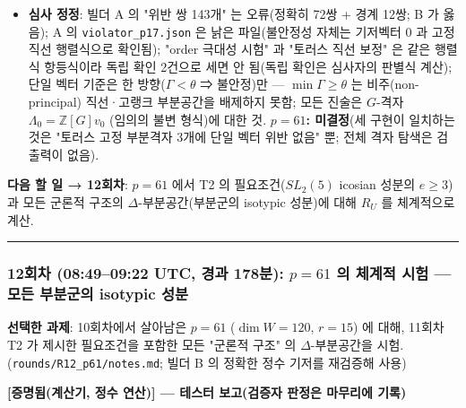 \begin{itemize}
\item
  \textbf{심사 정정}: 빌더 A 의 "위반 쌍 143개" 는 오류(정확히 72쌍 + 경계 12쌍; B 가 옳음); A 의 \texttt{violator\_p17.json} 은 낡은 파일(불안정성 자체는 기저벡터 0 과 고정직선 행렬식으로 확인됨); "order 극대성 시험" 과 "토러스 직선 보정" 은 같은 행렬식 항등식이라 독립 확인 2건으로 세면 안 됨(독립 확인은 심사자의 판별식 계산); 단일 벡터 기준은 한 방향(\(\Gamma<\theta\) ⇒ 불안정)만 --- \(\min\Gamma\ge\theta\) 는 비주(non-principal) 직선·고랭크 부분공간을 배제하지 못함; 모든 진술은 \(G\)-격자 \(\Lambda_0=\mathbb Z[G]v_0\) (임의의 불변 형식)에 대한 것. \textbf{\(p=61\): 미결정}(세 구현이 일치하는 것은 "토러스 고정 부분격자 3개에 단일 벡터 위반 없음" 뿐; 전체 격자 탐색은 검출력이 없음).
\end{itemize}

\textbf{다음 할 일 → 12회차}: \(p=61\) 에서 T2 의 필요조건(\(SL_2(5)\) icosian 성분의 \(e\ge3\))과 모든 군론적 구조의 \(\Delta\)-부분공간(부분군의 isotypic 성분)에 대해 \(R_U\) 를 체계적으로 계산.

\begin{center}\rule{0.5\linewidth}{0.5pt}\end{center}

\hypertarget{uxd68cuxcc28-08490922-utc-uxacbduxacfc-178uxbd84-p61-uxc758-uxccb4uxacc4uxc801-uxc2dcuxd5d8-uxbaa8uxb4e0-uxbd80uxbd84uxad70uxc758-isotypic-uxc131uxbd84}{%
\subsubsection*{\texorpdfstring{12회차 (08:49--09:22 UTC, 경과 178분): \(p=61\) 의 체계적 시험 --- 모든 부분군의 isotypic 성분}{12회차 (08:49--09:22 UTC, 경과 178분): p=61 의 체계적 시험 --- 모든 부분군의 isotypic 성분}}\label{uxd68cuxcc28-08490922-utc-uxacbduxacfc-178uxbd84-p61-uxc758-uxccb4uxacc4uxc801-uxc2dcuxd5d8-uxbaa8uxb4e0-uxbd80uxbd84uxad70uxc758-isotypic-uxc131uxbd84}}

\textbf{선택한 과제}: 10회차에서 살아남은 \(p=61\) (\(\dim W=120\), \(r=15\)) 에 대해, 11회차 T2 가 제시한 필요조건을 포함한 모든 "군론적 구조" 의 \(\Delta\)-부분공간을 시험. (\texttt{rounds/R12\_p61/notes.md}; 빌더 B 의 정확한 정수 기저를 재검증해 사용)

\textbf{{[}증명됨(계산기, 정수 연산){]} --- 테스터 보고(검증자 판정은 마무리에 기록)}


